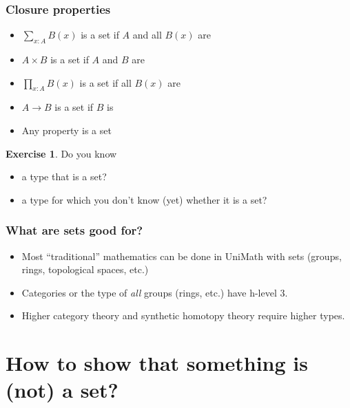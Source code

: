 \documentclass{beamer}
\theoremstyle{definition}
\newtheorem{exercise}{Exercise}
\begin{document}
\begin{frame}
 \frametitle{Closure properties}

   \begin{itemize}
    \item $\sum_{x:A}B(x)$ is a set if $A$ and all $B(x)$ are
    \item $A \times B$ is a set if $A$ and $B$ are
    \item $\prod_{x:A}B(x)$ is a set if all $B(x)$ are
    \item $A \to B$ is a set if $B$ is
   \end{itemize}

   \begin{itemize}
    \item Any property is a set
   \end{itemize}

   \begin{exercise}
          Do you know

     \begin{itemize}
      \item a type that is a set?
      \item a type for which you don't know (yet) whether it is a set?
     \end{itemize}

   \end{exercise}

\end{frame}

\begin{frame}
  \frametitle{What are sets good for?}

  \begin{itemize}
  \item Most ``traditional'' mathematics can be done in UniMath with sets (groups, rings, topological spaces, etc.) \pause
  \item Categories or the type of \emph{all} groups (rings, etc.) have h-level 3. \pause
  \item Higher category theory and synthetic homotopy theory require higher types.
  \end{itemize}
\end{frame}



\section{How to show that something is (not) a set?}
\end{document}
